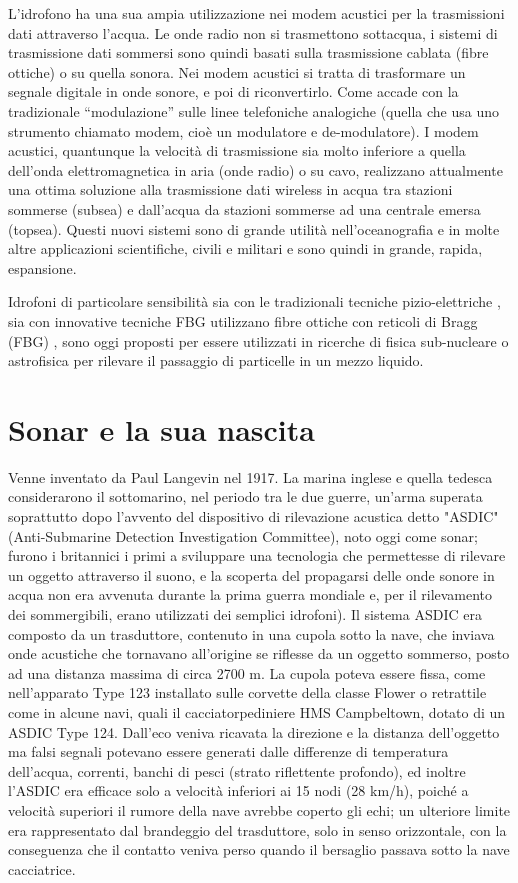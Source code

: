 L’idrofono ha una sua ampia utilizzazione nei modem acustici per la trasmissioni dati attraverso l’acqua. 
Le onde radio non si trasmettono sottacqua, i sistemi di trasmissione dati sommersi sono quindi basati sulla trasmissione cablata (fibre ottiche) o su quella sonora. 
Nei modem acustici si tratta di trasformare un segnale digitale in onde sonore, e poi di riconvertirlo. 
Come accade con la tradizionale “modulazione” sulle linee telefoniche analogiche (quella che usa uno strumento chiamato modem, cioè un modulatore e de-modulatore). 
I modem acustici, quantunque la velocità di trasmissione sia molto inferiore a quella dell’onda elettromagnetica in aria (onde radio) o su cavo, realizzano attualmente una ottima soluzione alla trasmissione dati wireless in acqua tra stazioni sommerse (subsea) e dall’acqua da stazioni sommerse ad una centrale emersa (topsea). 
Questi nuovi sistemi sono di grande utilità nell’oceanografia e in molte altre applicazioni scientifiche, civili e militari e sono quindi in grande, rapida, espansione. 

Idrofoni di particolare sensibilità sia con le tradizionali tecniche pizio-elettriche , sia con innovative tecniche FBG utilizzano fibre ottiche con reticoli di Bragg (FBG) , sono oggi proposti per essere utilizzati in ricerche di fisica sub-nucleare o astrofisica per rilevare il passaggio di particelle in un mezzo liquido.

\section {Sonar e la sua nascita}

Venne inventato da Paul Langevin nel 1917. 
La marina inglese e quella tedesca considerarono il sottomarino, nel periodo tra le due guerre, un'arma superata soprattutto dopo l'avvento del dispositivo di rilevazione acustica detto "ASDIC" (Anti-Submarine Detection Investigation Committee), noto oggi come sonar; furono i britannici i primi a sviluppare una tecnologia che permettesse di rilevare un oggetto attraverso il suono, e la scoperta del propagarsi delle onde sonore in acqua non era avvenuta durante la prima guerra mondiale e, per il rilevamento dei sommergibili, erano utilizzati dei semplici idrofoni). 
Il sistema ASDIC era composto da un trasduttore, contenuto in una cupola sotto la nave, che inviava onde acustiche che tornavano all'origine se riflesse da un oggetto sommerso, posto ad una distanza massima di circa 2700 m. 
La cupola poteva essere fissa, come nell'apparato Type 123 installato sulle corvette della classe Flower o retrattile come in alcune navi, quali il cacciatorpediniere HMS Campbeltown, dotato di un ASDIC Type 124. 
Dall'eco veniva ricavata la direzione e la distanza dell'oggetto ma falsi segnali potevano essere generati dalle differenze di temperatura dell'acqua, correnti, banchi di pesci (strato riflettente profondo), ed inoltre l'ASDIC era efficace solo a velocità inferiori ai 15 nodi (28 km/h), poiché a velocità superiori il rumore della nave avrebbe coperto gli echi; un ulteriore limite era rappresentato dal brandeggio del trasduttore, solo in senso orizzontale, con la conseguenza che il contatto veniva perso quando il bersaglio passava sotto la nave cacciatrice.

